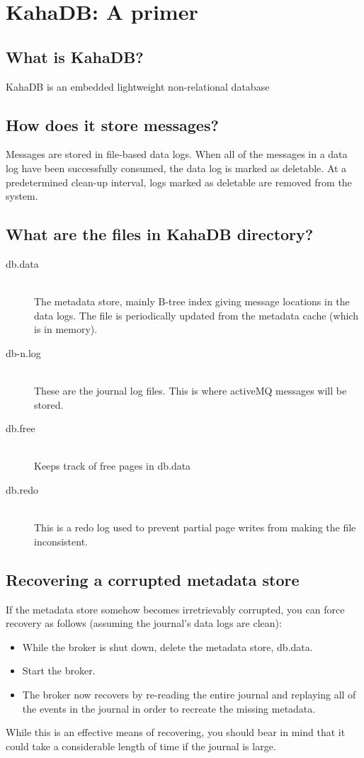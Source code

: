 \section{KahaDB: A primer}
	\subsection{What is KahaDB?}
	KahaDB is an embedded lightweight non-relational database

	\subsection{How does it store messages?}
	Messages are stored in file-based data logs. When all of the messages in a data log have been successfully consumed, the data log is marked as deletable. At a predetermined clean-up interval, logs marked as deletable are removed from the system.


	\subsection{What are the files in KahaDB directory?}
		\begin{description}
			\item[db.data] \hfill \\
				The metadata store, mainly B-tree index giving message locations in the data logs. The file is periodically updated from the metadata cache (which is in memory).
			\item[db-n.log] \hfill \\
				These are the journal log files. This is where activeMQ messages will be stored.
			\item[db.free] \hfill \\
				Keeps track of free pages in db.data
			\item[db.redo] \hfill \\
				This is a redo log used to prevent partial page writes from making the file inconsistent.
		\end{description}


	\subsection{Recovering a corrupted metadata store}
	If the metadata store somehow becomes irretrievably corrupted, you can force recovery as follows (assuming the journal's data logs are clean):

	\begin{itemize}
    	\item While the broker is shut down, delete the metadata store, db.data.
    	\item Start the broker.
    	\item The broker now recovers by re-reading the entire journal and replaying all of the events in the journal in order to recreate the missing metadata.
    \end{itemize}
	While this is an effective means of recovering, you should bear in mind that it could take a considerable length of time if the journal is large.